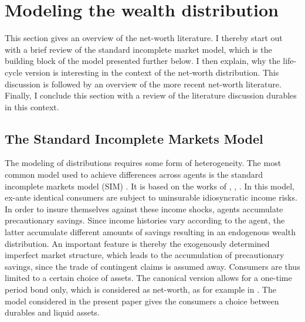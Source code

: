 \documentclass[a4paper,12pt,legno]{article}
\begin{document}
\section{Modeling the wealth distribution}
This section gives an overview of the net-worth literature. I thereby start out with a brief review of the standard incomplete market model, which is the building block of the model presented further below. I then explain, why the life-cycle version is interesting in the context of the net-worth distribution. This discussion is followed by an overview of the more recent net-worth literature. Finally, I conclude this section with a review of the literature discussion durables in this context. 

\label{Modeling the wealth distribution}
\subsection{The Standard Incomplete Markets Model}
The modeling of distributions requires some form of heterogeneity. The most common model used to achieve differences across agents is the standard incomplete markets model (SIM)   \citep{heathcote2009quantitative}. It is based on the works of \cite{bewley1977permanent}, \cite{aiyagari1994}, \cite{huggett1993risk}. In this model, ex-ante identical consumers are subject to uninsurable idiosyncratic income risks. In order to insure themselves against these income shocks, agents accumulate precautionary savings. Since income histories vary according to the agent, the latter accumulate different amounts of savings resulting in an endogenous wealth distribution. An important feature is thereby the exogenously determined imperfect market structure, which leads to the accumulation of precautionary savings, since the trade of contingent claims is assumed away. Consumers are thus limited to a certain choice of assets. The canonical version allows for a one-time period bond only, which is considered as net-worth, as for example in \cite{hintermaier2011}. The model considered in the present paper gives the consumers a choice between durables and liquid assets. 
\end{document}
